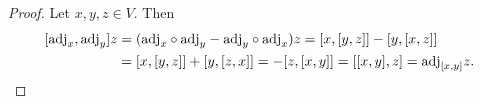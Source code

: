 \begin{proof}
  Let $x, y, z \in V$.
  Then
  \begin{equation}
    \begin{split}
      [{\rm adj}_x, {\rm adj}_y] z
      & = ({\rm adj}_x \circ {\rm adj}_y - {\rm adj}_y \circ {\rm adj}_x) z
      = [x, [y, z]] - [y, [x, z]] \\
      & = [x, [y, z]] + [y, [z, x]]
      = - [z, [x, y]]
      = [[x, y], z]
      = {\rm adj}_{[x, y]} z.
      \qedhere
    \end{split}
  \end{equation}
\end{proof}
